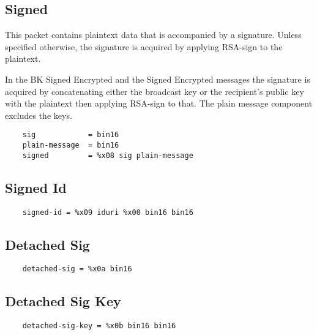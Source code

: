 \documentclass[letterpaper,11pt,oneside]{article}
\begin{document}
\subsection{Signed}
\label{signed-packet}

This packet contains plaintext data that is accompanied by a signature. Unless
specified otherwise, the signature is acquired by applying RSA-sign to the
plaintext. 

In the BK Signed Encrypted and the Signed Encrypted messages the
signature is acquired by concatenating either the broadcast key or the
recipient's public key with the plaintext then applying RSA-sign to that. The
plain message component excludes the keys.

\vspace{10pt}
\begin{verbatim}
    sig            = bin16
    plain-message  = bin16
    signed         = %x08 sig plain-message
\end{verbatim}
\vspace{10pt}

\subsection{Signed Id}
\label{signed-packet}

\vspace{10pt}
\begin{verbatim}
    signed-id = %x09 iduri %x00 bin16 bin16
\end{verbatim}
\vspace{10pt}

\subsection{Detached Sig}

\vspace{10pt}
\begin{verbatim}
    detached-sig = %x0a bin16
\end{verbatim}
\vspace{10pt}

\subsection{Detached Sig Key}

\vspace{10pt}
\begin{verbatim}
    detached-sig-key = %x0b bin16 bin16
\end{verbatim}
\vspace{10pt}
\end{document}

